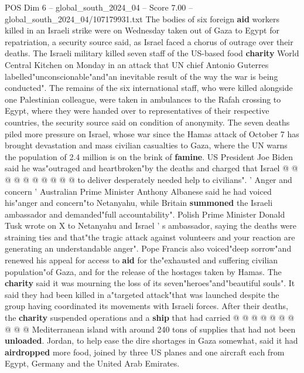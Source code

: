 \begin{textsample}{POS Dim 6 – global\_south\_2024\_04 – Score 7.00 – global\_south\_2024\_04/107179931.txt}  \label{ex:f6_pos_090}
The bodies of six foreign \textbf{aid} workers killed in an Israeli strike were on Wednesday taken out of Gaza to Egypt for repatriation, a security source said, as Israel faced a chorus of outrage over their deaths.
The Israeli military killed seven staff of the US-based food \textbf{charity} World Central Kitchen on Monday in an attack that UN chief Antonio Guterres labelled"unconscionable"and"an inevitable result of the way the war is being conducted".
The remains of the six international staff, who were killed alongside one Palestinian colleague, were taken in ambulances to the Rafah crossing to Egypt, where they were handed over to representatives of their respective countries, the security source said on condition of anonymity.
The seven deaths piled more pressure on Israel, whose war since the Hamas attack of October 7 has brought devastation and mass civilian casualties to Gaza, where the UN warns the population of 2.4 million is on the brink of \textbf{famine}.
US President Joe Biden said he was"outraged and heartbroken"by the deaths and charged that Israel @ @ @ @ @ @ @ @ @ @ to deliver desperately needed help to civilians". ' Anger and concern ' Australian Prime Minister Anthony Albanese said he had voiced his"anger and concern"to Netanyahu, while Britain \textbf{summoned} the Israeli ambassador and demanded"full accountability".
Polish Prime Minister Donald Tusk wrote on X to Netanyahu and Israel ' s ambassador, saying the deaths were straining ties and that"the tragic attack against volunteers and your reaction are generating an understandable anger".
Pope Francis also voiced"deep sorrow"and renewed his appeal for access to \textbf{aid} for the"exhausted and suffering civilian population"of Gaza, and for the release of the hostages taken by Hamas.
The \textbf{charity} said it was mourning the loss of its seven"heroes"and"beautiful souls".
It said they had been killed in a"targeted attack"that was launched despite the group having coordinated its movements with Israeli forces.
After their deaths, the \textbf{charity} suspended operations and a \textbf{ship} that had carried @ @ @ @ @ @ @ @ @ @ Mediterranean island with around 240 tons of supplies that had not been \textbf{unloaded}.
Jordan, to help ease the dire shortages in Gaza somewhat, said it had \textbf{airdropped} more food, joined by three US planes and one aircraft each from Egypt, Germany and the United Arab Emirates.

\end{textsample}
